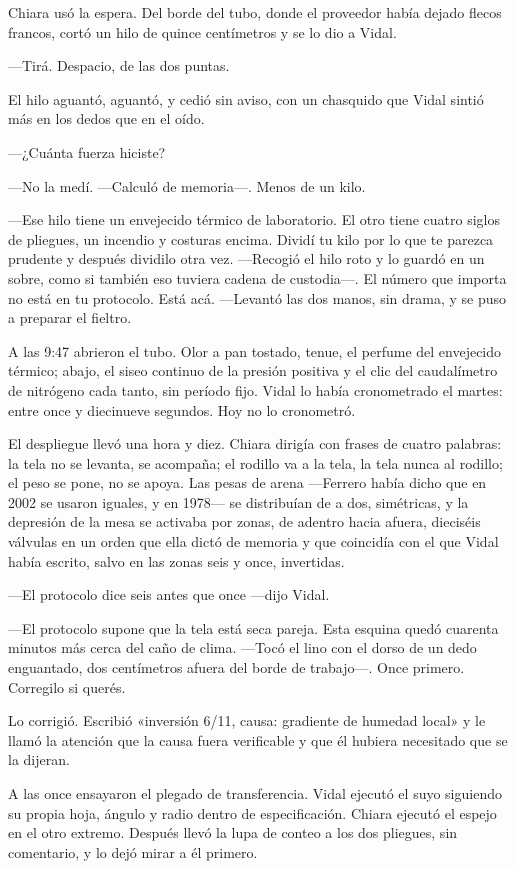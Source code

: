 Chiara usó la espera. Del borde del tubo, donde el proveedor había dejado flecos francos, cortó un hilo de quince centímetros y se lo dio a Vidal.

---Tirá. Despacio, de las dos puntas.

El hilo aguantó, aguantó, y cedió sin aviso, con un chasquido que Vidal sintió más en los dedos que en el oído.

---¿Cuánta fuerza hiciste?

---No la medí. ---Calculó de memoria---. Menos de un kilo.

---Ese hilo tiene un envejecido térmico de laboratorio. El otro tiene cuatro siglos de pliegues, un incendio y costuras encima. Dividí tu kilo por lo que te parezca prudente y después dividilo otra vez. ---Recogió el hilo roto y lo guardó en un sobre, como si también eso tuviera cadena de custodia---. El número que importa no está en tu protocolo. Está acá. ---Levantó las dos manos, sin drama, y se puso a preparar el fieltro.

A las 9:47 abrieron el tubo. Olor a pan tostado, tenue, el perfume del envejecido térmico; abajo, el siseo continuo de la presión positiva y el clic del caudalímetro de nitrógeno cada tanto, sin período fijo. Vidal lo había cronometrado el martes: entre once y diecinueve segundos. Hoy no lo cronometró.

El despliegue llevó una hora y diez. Chiara dirigía con frases de cuatro palabras: la tela no se levanta, se acompaña; el rodillo va a la tela, la tela nunca al rodillo; el peso se pone, no se apoya. Las pesas de arena ---Ferrero había dicho que en 2002 se usaron iguales, y en 1978--- se distribuían de a dos, simétricas, y la depresión de la mesa se activaba por zonas, de adentro hacia afuera, dieciséis válvulas en un orden que ella dictó de memoria y que coincidía con el que Vidal había escrito, salvo en las zonas seis y once, invertidas.

---El protocolo dice seis antes que once ---dijo Vidal.

---El protocolo supone que la tela está seca pareja. Esta esquina quedó cuarenta minutos más cerca del caño de clima. ---Tocó el lino con el dorso de un dedo enguantado, dos centímetros afuera del borde de trabajo---. Once primero. Corregilo si querés.

Lo corrigió. Escribió «inversión 6/11, causa: gradiente de humedad local» y le llamó la atención que la causa fuera verificable y que él hubiera necesitado que se la dijeran.

A las once ensayaron el plegado de transferencia. Vidal ejecutó el suyo siguiendo su propia hoja, ángulo y radio dentro de especificación. Chiara ejecutó el espejo en el otro extremo. Después llevó la lupa de conteo a los dos pliegues, sin comentario, y lo dejó mirar a él primero.


